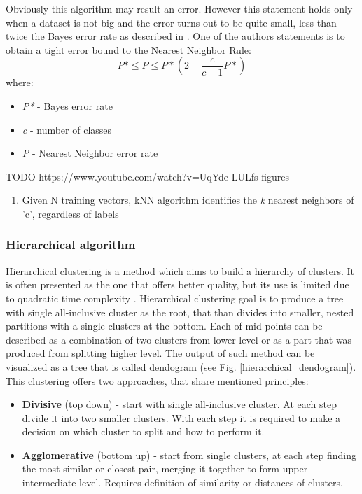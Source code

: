 		Obviously this algorithm may result an error. However this statement holds only when a dataset is not big and the error turns out to be quite small, less than twice the Bayes error rate as described in \cite{duda-hart-classification}. One of the authors statements is to obtain a tight error bound to the Nearest Neighbor Rule:
		\[P*\leqslant P\leqslant P*(2-\frac{c}{c-1}P*)\]
		where:
		\begin{itemize}
			\item \textit{P*} - Bayes error rate
			\item \textit{c} - number of classes
			\item \textit{P} - Nearest Neighbor error rate
		\end{itemize}
	
	
	
	TODO https://www.youtube.com/watch?v=UqYde-LULfs figures
	\begin{enumerate}
	\item Given N training vectors, kNN	algorithm identifies the \textit{k} nearest neighbors of 'c', regardless of labels
	\end{enumerate}
	
	\subsubsection{Hierarchical algorithm}
	Hierarchical clustering is a method which aims to build a hierarchy of clusters. It is often presented as the one that offers better quality, but its use is limited due to quadratic time complexity \cite{k_means}. Hierarchical clustering goal is to produce a tree with single all-inclusive cluster as the root, that than divides into smaller, nested partitions with a single clusters at the bottom. Each of mid-points can be described as a combination of two clusters from lower level or as a part that was produced from splitting higher level. The output of such method can be visualized as a tree that is called dendogram (see Fig. \ref{hierarchical_dendogram}). This clustering offers two approaches, that share mentioned principles:
	
	\begin{itemize}
	\item \textbf{Divisive} (top down) - start with single all-inclusive cluster. At each step divide it into two smaller clusters. With each step it is required to make a decision on which cluster to split and how to perform it.
	\item \textbf{Agglomerative} (bottom up) - start from single clusters, at each step finding the most similar or closest pair, merging it together to form upper intermediate level. Requires definition of similarity or distances of clusters.
	\end{itemize}
	

